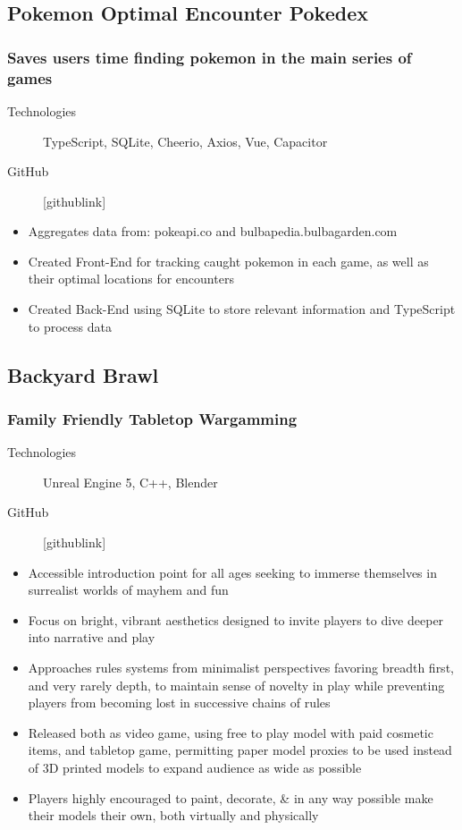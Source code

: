 \documentclass[10pt]{article} %
\begin{document}
\subsection{Pokemon Optimal Encounter Pokedex}
\subsubsection{Saves users time finding pokemon in the main series of games}
\begin{description}
    \item[Technologies] {TypeScript, SQLite, Cheerio, Axios, Vue, Capacitor}
    \item[GitHub] {[githublink]} 
\end{description}
\begin{itemize}
    \item {Aggregates data from: pokeapi.co and bulbapedia.bulbagarden.com}
    \item {Created Front-End for tracking caught pokemon in each game, 
        as well as their optimal locations for encounters}
    \item {Created Back-End using SQLite to store relevant information and TypeScript
        to process data}
\end{itemize}

\subsection{Backyard Brawl}
\subsubsection{Family Friendly Tabletop Wargamming}
\begin{description}
    \item[Technologies] {Unreal Engine 5, C++, Blender}
    \item[GitHub] {[githublink]}
\end{description}
\begin{itemize}
    \item {Accessible introduction point for all ages seeking to immerse themselves
        in surrealist worlds of mayhem and fun}
    \item {Focus on bright, vibrant aesthetics designed to invite players to dive 
        deeper into narrative and play}
    \item {Approaches rules systems from minimalist perspectives favoring breadth 
        first, and very rarely depth, to maintain sense of novelty in play while 
        preventing players from becoming lost in successive chains of rules}
    \item {Released both as video game, using free to play model with paid 
        cosmetic items, and tabletop game, permitting paper model proxies to be 
        used instead of 3D printed models to expand audience as wide as possible}
    \item {Players highly encouraged to paint, decorate, \& in any way possible make 
        their models their own, both virtually and physically}
\end{itemize}
\end{document}
